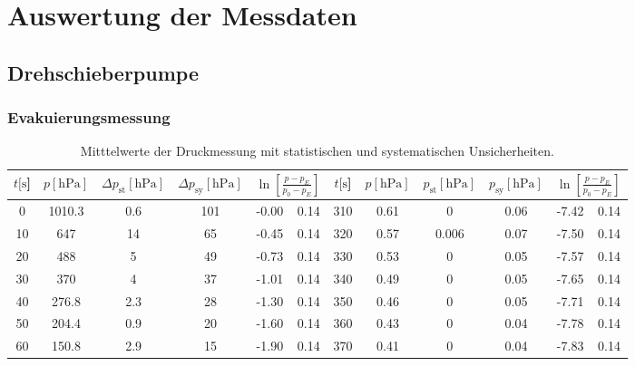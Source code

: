 \section{Auswertung der Messdaten}
\label{sec:Auswertung}
\subsection{Drehschieberpumpe}
\subsubsection{Evakuierungsmessung}
\begin{table}[H]
    \centering
      \caption{Mitttelwerte der Druckmessung mit statistischen und systematischen Unsicherheiten.}
      \label{tab:Dreh_Evak}
      \begin{tabular}{
        S[table-format=3.0] S[table-format=3.2] S[table-format=1.3] S[table-format=3.2] S @{${}\pm{}$} S | 
        S[table-format=3.0] S[table-format=3.2] S[table-format=1.3] S[table-format=1.3] S @{${}\pm{}$} S
        }
        \toprule
        {$t [\si{\second}$]} & 
        {$p [\si{\hecto\pascal}]$} & 
        {$\Delta p_\text{st} [\si{\hecto\pascal}]$} & 
        {$\Delta p_\text{sy} [\si{\hecto\pascal}]$} & 
         &
        {$t [\si{\second}$]} & 
        {$p [\si{\hecto\pascal}]$} & 
        {$p_\text{st} [\si{\hecto\pascal}]$} & 
        {$p_\text{sy} [\si{\hecto\pascal}]$} &
         \\
           & 1010.3 & 0.6  & 101     & -0.00 & 0.14 &   310 & 0.61   & 0       & 0.06  & -7.42 & 0.14\\
        10  & 647    & 14   & 65      & -0.45 & 0.14 &   320 & 0.57   & 0.006   & 0.07  & -7.50 & 0.14\\
        20  & 488    & 5    & 49      & -0.73 & 0.14 &   330 & 0.53   & 0       & 0.05  & -7.57 & 0.14\\
        30  & 370    & 4    & 37      & -1.01 & 0.14 &   340 & 0.49   & 0       & 0.05  & -7.65 & 0.14\\
        40  & 276.8  & 2.3  & 28      & -1.30 & 0.14 &   350 & 0.46   & 0       & 0.05  & -7.71 & 0.14\\
        50  & 204.4  & 0.9  & 20      & -1.60 & 0.14 &   360 & 0.43   & 0       & 0.04  & -7.78 & 0.14\\
        60  & 150.8  & 2.9  & 15      & -1.90 & 0.14 &   370 & 0.41   & 0       & 0.04  & -7.83 & 0.14\\

\end{tabular}
\end{table}
